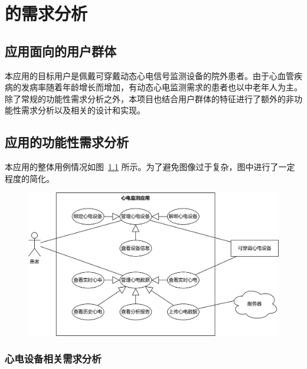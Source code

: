 

\chapter{\app 的需求分析}\label{ch:req}


\section{应用面向的用户群体}\label{sec:target-user}

本应用的目标用户是佩戴可穿戴动态心电信号监测设备的院外患者。由于心血管疾病的发病率随着年龄增长而增加\cite{Zhongguoxinxieguanjiankangyujibingbaogao20212022}，有动态心电监测需求的患者也以中老年人为主。除了常规的功能性需求分析之外，本项目也结合用户群体的特征进行了额外的非功能性需求分析以及相关的设计和实现。


\section{应用的功能性需求分析}\label{sec:func-req}

本应用的整体用例情况如图~\ref{fig:use-case} 所示。为了避免图像过于复杂，图中进行了一定程度的简化。

\begin{figure}[ht]
    \includegraphics[width=\textwidth]{../assets/use-case.drawio}
    \label{fig:use-case}
\end{figure}

\subsection{心电设备相关需求分析}\label{subsec:device-req}

